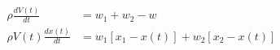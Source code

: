 \begin{equation}
  \begin{aligned}
    \rho \frac{dV(t)}{dt}      & = w_1 + w_2 - w
    \\
    \rho V(t) \frac{dx(t)}{dt} & = w_1 [x_1 - x(t)] + w_2 [x_2 - x(t)]
  \end{aligned} \label{eq:blending01_1}
\end{equation}
